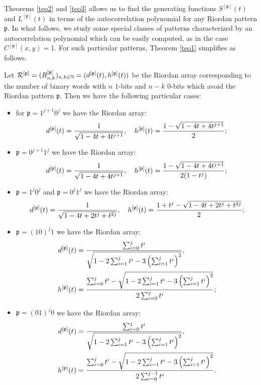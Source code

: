 Theorems \ref{teo2} and \ref{teo3} allows us to find the generating functions $S^{[\mathfrak{p}]}(t)$ and $L^{[\mathfrak{p}]}(t)$
 in terms of the autocorrelation polynomial for any Riordan pattern $\mathfrak{p}.$
 In what follows, we study some special classes of patterns characterized by an autocorrelation polynomial which can be easily computed, as
 in the case $C^{[\mathfrak{p}]}(x,y)=1.$
For such particular patterns, Theorem \ref{teo1} simplifies as follows.

\begin{coro}
\label{corodh}
Let  ${\cal{R}^{[\mathfrak{p}]}}=(R_{n, k}^{[\mathfrak{p}]})_{n,k\in\mathbb{N}}=(d^{[\mathfrak{p}]}(t),h^{[\mathfrak{p}]}(t))$  be the
Riordan array corresponding to the number of binary words with $n$ $1$-bits  and
$n-k$  $0$-bits  which avoid the Riordan pattern $\mathfrak{p}.$ Then we have
the following particular cases:
\begin{itemize}

\item for $\mathfrak{p}=1^{j+1}0^j$ we have the Riordan array:
$$ d^{[\mathfrak{p}]}(t)={1 \over \sqrt{1-4t+4t^{j+1}}}, \quad h^{[\mathfrak{p}]}(t)={1 -\sqrt{1-4t+4t^{j+1}} \over 2 };$$

\item $\mathfrak{p}=0^{j+1}1^j$ we have the Riordan array:
$$ d^{[\mathfrak{p}]}(t)={1 \over \sqrt{1-4t+4t^{j+1}}}, \quad h^{[\mathfrak{p}]}(t)={1 -\sqrt{1-4t+4t^{j+1}} \over 2(1-t^j) };$$

\item $\mathfrak{p}=1^{j}0^j$ and $\mathfrak{p}=0^{j}1^j$ we have the Riordan array:
$$ d^{[\mathfrak{p}]}(t)={1 \over \sqrt{1-4t+2t^j+t^{2j}}}, \quad h^{[\mathfrak{p}]}(t)={{1+t^j -\sqrt{1-4t+2t^j+t^{2j}} } \over 2 };$$

\item $\mathfrak{p}=(10)^j1$ we have the Riordan array:
\begin{displaymath}
\begin{split}
d^{[\mathfrak{p}]}(t) &= { \sum_{i=0}^j t^i \over \sqrt{1-2\sum_{i=1}^jt^i-3 \left( \sum_{i=1}^j t^i \right)^2}},\\
h^{[\mathfrak{p}]}(t) &= {\sum_{i=0}^jt^i -\sqrt{1-2\sum_{i=1}^jt^i-3\left( \sum_{i=1}^j t^i \right)^2} \over 2 \sum_{i=0}^jt^i};
\end{split}
\end{displaymath}

\item $\mathfrak{p}=(01)^j0$ we have the Riordan array:
\begin{displaymath}
\begin{split}
d^{[\mathfrak{p}]}(t) &= { \sum_{i=0}^j t^i \over \sqrt{1-2\sum_{i=1}^jt^i-3 \left( \sum_{i=1}^j t^i \right)^2}},\\
h^{[\mathfrak{p}]}(t) &= {\sum_{i=0}^jt^i -\sqrt{1-2\sum_{i=1}^jt^i-3\left( \sum_{i=1}^j t^i \right)^2} \over 2 \sum_{i=0}^{j-1}t^i}.
\end{split}
\end{displaymath}

\end{itemize}
\end{coro}

